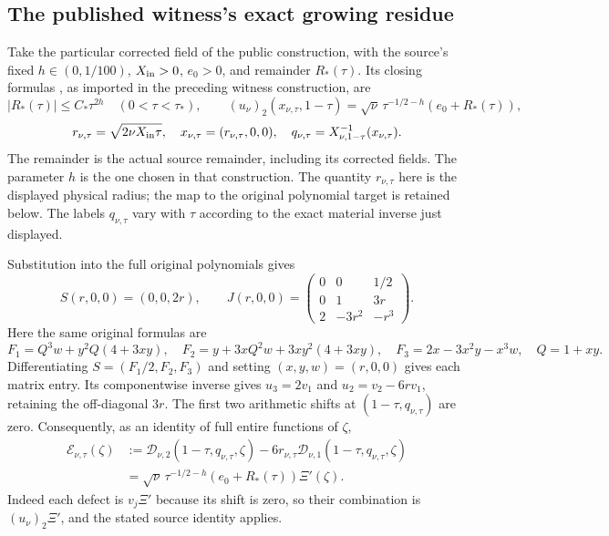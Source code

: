 \subsection{The published witness's exact growing residue}

Take the particular corrected field of the public construction, with
the source's fixed $h\in(0,1/100)$, $X_{\rm in}>0$, $e_0>0$,
and remainder $R_*(\tau)$. Its closing formulas
\cite[equations (10.20)--(10.22), p.~124]{cqNS2026}, as imported
in the preceding witness construction, are
\[
 |R_*(\tau)|\leq C_*\tau^{2h}\quad(0<\tau<\tau_*),\qquad
 (u_\nu)_2(x_{\nu,\tau},1-\tau)
   =\sqrt\nu\,\tau^{-1/2-h}(e_0+R_*(\tau)),
\]
\[
 r_{\nu,\tau}=\sqrt{2\nu X_{\rm in}\tau},\quad
 x_{\nu,\tau}=(r_{\nu,\tau},0,0),\quad
 q_{\nu,\tau}=X_{\nu,1-\tau}^{-1}(x_{\nu,\tau}).
\]
The remainder is the actual source remainder, including its corrected
fields. The parameter $h$ is the one chosen in that construction.
The quantity $r_{\nu,\tau}$ here is the displayed physical radius;
the map to the original polynomial target is retained below.
The labels $q_{\nu,\tau}$ vary with $\tau$ according to the exact
material inverse just displayed.

Substitution into the full original polynomials gives
\[
 S(r,0,0)=(0,0,2r),\qquad
 J(r,0,0)=
 \begin{pmatrix}
 0&0&1/2\\
 0&1&3r\\
 2&-3r^2&-r^3
 \end{pmatrix}.
\]
Here the same original formulas are
\[
 F_1=Q^3w+y^2Q(4+3xy),\quad
 F_2=y+3xQ^2w+3xy^2(4+3xy),\quad
 F_3=2x-3x^2y-x^3w,\quad Q=1+xy.
\]
Differentiating $S=(F_1/2,F_2,F_3)$ and setting $(x,y,w)=(r,0,0)$
gives each matrix entry. Its componentwise inverse gives
$u_3=2v_1$ and $u_2=v_2-6rv_1$, retaining the off-diagonal $3r$.
The first two arithmetic shifts at $(1-\tau,q_{\nu,\tau})$ are zero.
Consequently, as an identity of full entire functions of $\zeta$,
\begin{equation}
\begin{split}
 \mathcal E_{\nu,\tau}(\zeta)
 &:=\mathcal D_{\nu,2}(1-\tau,q_{\nu,\tau},\zeta)
       -6r_{\nu,\tau}
          \mathcal D_{\nu,1}(1-\tau,q_{\nu,\tau},\zeta)\\
 &=\sqrt\nu\,\tau^{-1/2-h}
                    (e_0+R_*(\tau))\Xi'(\zeta).
\end{split}
 \label{eq:cq-actual-witness-entire-defect}
\end{equation}
Indeed each defect is $v_j\Xi'$ because its shift is zero, so their
combination is $(u_\nu)_2\Xi'$, and the stated source identity applies.

